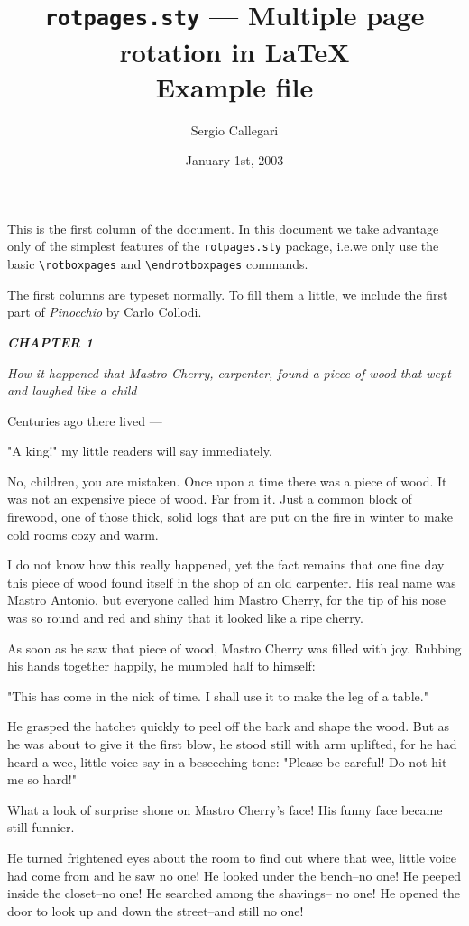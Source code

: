 \documentclass[12pt,twoside,twocolumn]{article}
\title{\texttt{rotpages.sty} --- Multiple page rotation in \LaTeX\\
  Example file}
\author{Sergio Callegari}
\date{January 1st, 2003}
\begin{document}
\sloppy
\pagestyle{fancy}
\maketitle
\thispagestyle{fancy}

This is the first column of the document. In this document we take
advantage only of the simplest features of the \texttt{rotpages.sty}
package, i.e.\@ we only use the basic \verb|\rotboxpages| and
\verb|\endrotboxpages| commands.


The first columns are typeset normally.  To fill them a little, we include
the first part of \emph{Pinocchio} by Carlo Collodi.

\bigskip
{\slshape%
  \textbf{CHAPTER 1}

  \emph{How it happened that Mastro Cherry, carpenter,
  found a piece of wood that wept and laughed like a child}
  \medskip

  Centuries ago there lived ---

  "A king!" my little readers will say immediately.

  No, children, you are mistaken.  Once upon a time
  there was a piece of wood.  It was not an expensive piece
  of wood.  Far from it.  Just a common block of firewood,
  one of those thick, solid logs that are put on the fire in
  winter to make cold rooms cozy and warm.

  I do not know how this really happened, yet the fact
  remains that one fine day this piece of wood found itself
  in the shop of an old carpenter.  His real name was
  Mastro Antonio, but everyone called him Mastro Cherry,
  for the tip of his nose was so round and red and shiny
  that it looked like a ripe cherry.

  As soon as he saw that piece of wood, Mastro Cherry
  was filled with joy.  Rubbing his hands together happily,
  he mumbled half to himself:

  "This has come in the nick of time.  I shall use it to
  make the leg of a table."

  He grasped the hatchet quickly to peel off the bark and
  shape the wood.  But as he was about to give it the first
  blow, he stood still with arm uplifted, for he had heard a
  wee, little voice say in a beseeching tone:  "Please be careful!
  Do not hit me so hard!"

  What a look of surprise shone on Mastro Cherry's
  face!  His funny face became still funnier.

  He turned frightened eyes about the room to find out
  where that wee, little voice had come from and he saw
  no one! He looked under the bench--no one! He peeped
  inside the closet--no one! He searched among the shavings--
  no one! He opened the door to look up and down
  the street--and still no one!

}
\end{document}
